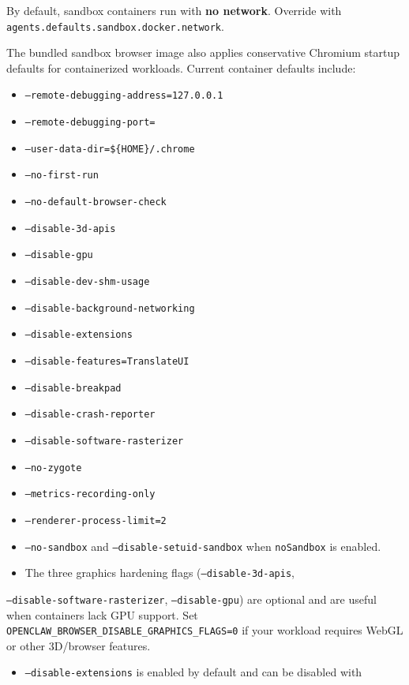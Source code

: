 By default, sandbox containers run with \textbf{no network}.
Override with \texttt{agents.defaults.sandbox.docker.network}.

The bundled sandbox browser image also applies conservative Chromium startup defaults
for containerized workloads. Current container defaults include:

\begin{itemize}
  \item \texttt{--remote-debugging-address=127.0.0.1}
  \item \texttt{--remote-debugging-port=}
  \item \texttt{--user-data-dir=\$\{HOME\}/.chrome}
  \item \texttt{--no-first-run}
  \item \texttt{--no-default-browser-check}
  \item \texttt{--disable-3d-apis}
  \item \texttt{--disable-gpu}
  \item \texttt{--disable-dev-shm-usage}
  \item \texttt{--disable-background-networking}
  \item \texttt{--disable-extensions}
  \item \texttt{--disable-features=TranslateUI}
  \item \texttt{--disable-breakpad}
  \item \texttt{--disable-crash-reporter}
  \item \texttt{--disable-software-rasterizer}
  \item \texttt{--no-zygote}
  \item \texttt{--metrics-recording-only}
  \item \texttt{--renderer-process-limit=2}
  \item \texttt{--no-sandbox} and \texttt{--disable-setuid-sandbox} when \texttt{noSandbox} is enabled.
  \item The three graphics hardening flags (\texttt{--disable-3d-apis},
\end{itemize}

\texttt{--disable-software-rasterizer}, \texttt{--disable-gpu}) are optional and are useful
when containers lack GPU support. Set \texttt{OPENCLAW\_BROWSER\_DISABLE\_GRAPHICS\_FLAGS=0}
if your workload requires WebGL or other 3D/browser features.
\begin{itemize}
  \item \texttt{--disable-extensions} is enabled by default and can be disabled with
\end{itemize}

